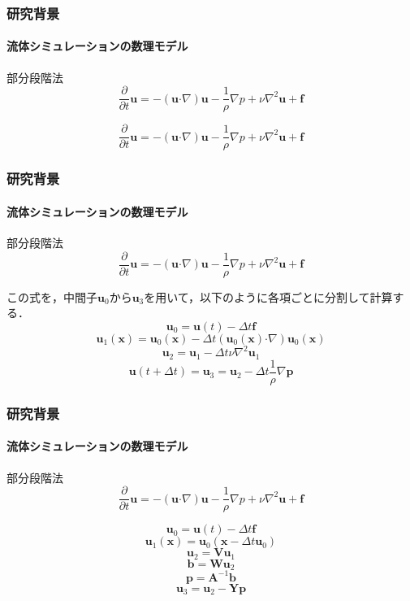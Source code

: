 \documentclass[aspectratio=169,dvipdfmx,hyperref={bookmarks=true}]{beamer}
\begin{document}
  \begin{frame}
  \frametitle{研究背景}
  \framesubtitle{流体シミュレーションの数理モデル}
    \begin{block}{部分段階法}
\[
\frac{\partial}{\partial t}\bm{u} = - (\bm{u} \boldsymbol{\cdot}\nabla) \bm{u} - \frac{1}{\rho}\nabla p + \nu\nabla^2\bm{u} + \bm{f}
\]

\[
\frac{\partial}{\partial t}\bm{u} = - (\bm{u} \boldsymbol{\cdot}\nabla) \bm{u} - \frac{1}{\rho}\nabla p + \nu\nabla^2\bm{u} + \bm{f}
\]
\end{block}
\end{frame}
  \begin{frame}
  \frametitle{研究背景}
  \framesubtitle{流体シミュレーションの数理モデル}
    \begin{block}{部分段階法}
\[
\frac{\partial}{\partial t}\bm{u} = - (\bm{u} \boldsymbol{\cdot}\nabla) \bm{u} - \frac{1}{\rho}\nabla p + \nu\nabla^2\bm{u} + \bm{f}
\]

この式を，中間子$\bm{u}_0$から$\bm{u}_3$を用いて，以下のように各項ごとに分割して計算する．
\begin{equation}\label{eq:force}
	\bm{u}_0 =  \bm{u} (t)  - \varDelta t \bm{f} 
\end{equation} 
\begin{equation}\label{eq:advect}
	\bm{u}_1 (\bm{x}) = \bm{u}_0 (\bm{x}) - \varDelta t (\bm{u}_0(\bm{x})  \boldsymbol{\cdot}\nabla) \bm{u}_0(\bm{x})
\end{equation}
\begin{equation}\label{eq:diffusion}
	\bm{u}_2   =  \bm{u}_1 - \varDelta t \nu\nabla^2\bm{u}_1
\end{equation}
\begin{equation}\label{eq:pressure}
	\bm{u} (t + \varDelta t)= \bm{u}_3  =  \bm{u}_2 - \varDelta t \frac{1}{\rho}\nabla \bm{p} 
\end{equation} 
\end{block}
\end{frame}
  \begin{frame}
  \frametitle{研究背景}
  \framesubtitle{流体シミュレーションの数理モデル}
    \begin{block}{部分段階法}
\[
\frac{\partial}{\partial t}\bm{u} = - (\bm{u} \boldsymbol{\cdot}\nabla) \bm{u} - \frac{1}{\rho}\nabla p + \nu\nabla^2\bm{u} + \bm{f}
\]

\[
	\bm{u}_0 =  \bm{u} (t)  - \varDelta t \bm{f} 	
\]
\[
	\bm{u}_1(\bm{x}) = \bm{u}_0(\bm{x}  - \varDelta t \bm{u}_0)
\]
\[
	\bm{u}_2   =  \bm{V}\bm{u}_1
\]
\[
	\bm{b} = \bm{W}\bm{u}_2
\]
\[
	\bm{p} = \bm{A}^{-1}\bm{b}
\]
\[
	\bm{u}_3  =  \bm{u}_2 - \bm{Y}\bm{p} 
\]
\end{block}
\end{frame}
\end{document}

